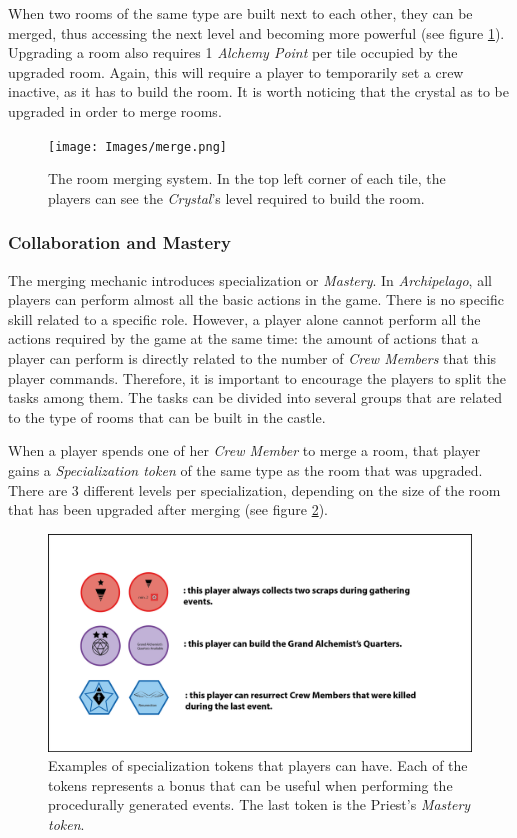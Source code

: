 When two rooms of the same type are built next to each other, they can be merged, thus accessing the next level and becoming more powerful (see figure \ref{fig:merge}). Upgrading a room also requires 1 \textit{Alchemy Point} per tile occupied by the upgraded room. Again, this will require a player to temporarily set a crew inactive, as it has to build the room. It is worth noticing that the crystal as to be upgraded in order to merge rooms.

\begin{figure}[!ht]
    \centering
    \texttt{[image: Images/merge.png]}
    \caption{The room merging system. In the top left corner of each tile, the players can see the \textit{Crystal}'s level required to build the room.} 
    \label{fig:merge}
\end{figure}
\subsubsection{Collaboration and Mastery}
The merging mechanic introduces specialization or \textit{Mastery}. In \textit{Archipelago}, all players can perform almost all the basic actions in the game. There is no specific skill related to a specific role. However, a player alone cannot perform all the actions required by the game at the same time: the amount of actions that a player can perform is directly related to the number of \textit{Crew Members} that this player commands. Therefore, it is important to encourage the players to split the tasks among them. The tasks can be divided into several groups that are related to the type of rooms that can be built in the castle. 

When a player spends one of her \textit{Crew Member} to merge a room, that player gains a \textit{Specialization token} of the same type as the room that was upgraded. There are 3 different levels per specialization, depending on the size of the room that has been upgraded after merging (see figure \ref{fig:spec}). 

\begin{figure}[!ht]
    \centering
    \includegraphics[width=\textwidth]{Images/Specialization.png}
    \caption{Examples of specialization tokens that players can have. Each of the tokens represents a bonus that can be useful when performing the procedurally generated events. The last token is the Priest's \textit{Mastery token}.}
    \label{fig:spec}
\end{figure}

